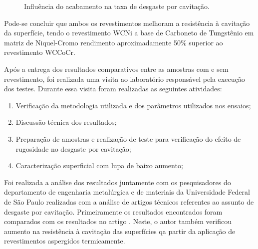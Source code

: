 \begin{figure}
	\centering
    \caption{Influência do acabamento na taxa de desgaste por cavitação.}
    \label{fig:adequacao7}
\end{figure}

Pode-se concluir que ambos os revestimentos melhoram a resistência à cavitação
da superfície, tendo o revestimento WCNi a base de Carboneto de Tungstênio em
matriz de Niquel-Cromo rendimento aproximadamente 50\% superior ao revestimento
WCCoCr.

Após a entrega dos resultados comparativos entre as amostras com e sem
revestimento, foi realizada uma visita ao laboratório responsável pela execução
dos testes. Durante essa visita foram realizadas as seguintes atividades:

\begin{enumerate}
  \item Verificação da metodologia utilizada e dos parâmetros utilizados nos
  ensaios;
  \item Discussão técnica dos resultados;
  \item Preparação de amostras e realização de teste para verificação do efeito
  de rugosidade no desgaste por cavitação;
  \item Caracterização superficial com lupa de baixo aumento; 
\end{enumerate}

Foi realizada a análise dos resultados juntamente com os pesquisadores do
departamento de engenharia metalúrgica e de materiais da Universidade Federal de São Paulo 
realizadas com a análise de artigos técnicos referentes ao assunto de desgaste
por cavitação. Primeiramente os resultados encontrados foram comparados com os
resultados no artigo \cite{santa2009slurry}. Neste, o autor também verificou
aumento na resistência à cavitação das superfícies qa partir da aplicação de
revestimentos aspergidos termicamente.

